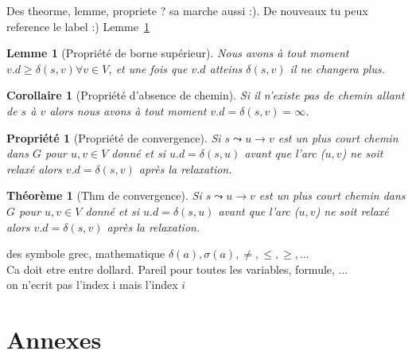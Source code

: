 \documentclass[12pt,a4paper,final]{article}
\newtheorem{prop}{Propriété}
\newtheorem{corollaire}{Corollaire}
\newtheorem{lemme}{Lemme}
\newtheorem{thm}{Théorème}
\begin{document}
Des theorme, lemme, propriete ? sa marche aussi :). De nouveaux tu peux reference le label :) Lemme~\ref{upper-bound_prop}

\begin{lemme}[Propriété de borne supérieur]\label{upper-bound_prop}
Nous avons à tout moment $v.d \geq \delta(s,v) \forall v \in V$, et une fois que $v.d$ atteins $\delta(s,v)$ il ne changera plus.
\end{lemme}

\begin{corollaire}[Propriété d'absence de chemin]\label{no_path_prop}
Si il n'existe pas de chemin allant de $s$ à $v$ alors nous avons à tout moment $v.d = \delta(s,v) = \infty$.
\end{corollaire}

\begin{prop}[Propriété de convergence]\label{convergence_prop}
Si $s \leadsto u \rightarrow v$ est un plus court chemin dans $G$ pour $u, v \in V$ donné et si $u.d = \delta(s,u)$ avant que l'arc ($u,v$) ne soit relaxé alors $v.d = \delta(s,v)$ après la relaxation.
\end{prop}

\begin{thm}[Thm de convergence]\label{convergence_thm}
Si $s \leadsto u \rightarrow v$ est un plus court chemin dans $G$ pour $u, v \in V$ donné et si $u.d = \delta(s,u)$ avant que l'arc ($u,v$) ne soit relaxé alors $v.d = \delta(s,v)$ après la relaxation.
\end{thm}

des symbole grec, mathematique $\delta(a), \sigma(a), \neq, \leq, \geq, ...$\\
Ca doit etre entre dollard. Pareil pour toutes les variables, formule, ...\\
on n'ecrit pas l'index i mais l'index $i$

\newpage
\section{Annexes} \label{sec:annexe}
\appendix %
\end{document}
